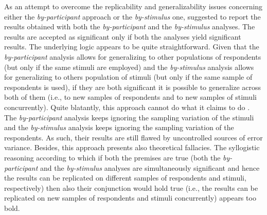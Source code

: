 \documentclass[12pt]{book}
\begin{document}
As an attempt to overcome the replicability and generalizability issues concerning either the \emph{by-participant} approach or the \emph{by-stimulus} one,  suggested to report the results obtained with both the \emph{by-participant} and the \emph{by-stimulus} analyses. The results are accepted as significant only if both the analyses yield significant results. 
The underlying logic appears to be quite straightforward. 
Given that the \emph{by-participant} analysis allows for generalizing to other populations of respondents (but only if the same stimuli are employed) and the \emph{by-stimulus} analysis allows for generalizing to others population of stimuli (but only if the same sample of respondents is used), if they are both significant it is possible to generalize across both of them (i.e., to new samples of respondents and to new samples of stimuli concurrently).
Quite blatantly, this approach cannot do what it claims to do \cite{raaijmakers1999, raaijmakers2003}. 
The \emph{by-participant} analysis keeps ignoring the sampling variation of the stimuli and the \emph{by-stimulus} analysis keeps ignoring the sampling variation of the respondents. As such, their results are still flawed by uncontrolled sources of error variance.
Besides, this approach presents also theoretical fallacies. 
The syllogistic reasoning according to which if both the premises are true (both the \emph{by-participant} and the \emph{by-stimulus} analyses are simultaneously significant and hence the results can  be replicated on different samples of respondents and stimuli, respectively) then also their conjunction would hold true (i.e., the results can be replicated on new samples of respondents and stimuli concurrently) appears too bold. 
\end{document}

